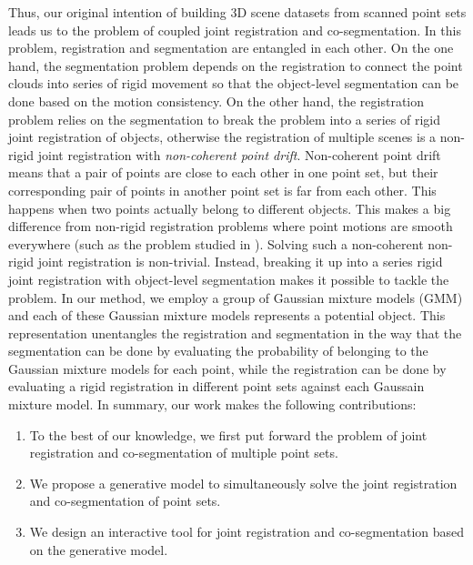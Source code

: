 Thus, our original intention of building 3D scene datasets from scanned point sets leads us to the problem of coupled joint registration and co-segmentation.
In this problem, registration and segmentation are entangled in each other. On the one hand, the segmentation problem depends on the registration to connect the point clouds into series of rigid movement so that the object-level segmentation can be done based on the motion consistency. 
On the other hand, the registration problem relies on the segmentation to break the problem into a series of rigid joint registration of objects, otherwise the registration of multiple scenes is a non-rigid joint registration with \emph{non-coherent point drift}.
%
Non-coherent point drift means that a pair of points are close to each other in one point set, but their corresponding pair of points in another point set is far from each other. 
This happens when two points actually belong to different objects.
%
This makes a big difference from non-rigid registration problems where point motions are smooth everywhere (such as the problem studied in \cite{CPD}).
%
Solving such a non-coherent non-rigid joint registration is non-trivial. Instead, breaking it up into a series rigid joint registration with object-level segmentation makes it possible to tackle the problem. 
%
In our method, we employ a group of Gaussian mixture models (GMM) and each of these Gaussian mixture models represents a potential object. 
This representation unentangles the registration and segmentation in the way that the segmentation can be done by evaluating the probability of belonging to the Gaussian mixture models for each point, while the registration can be done by evaluating a rigid registration in different point sets against each Gaussain mixture model.
%
In summary, our work makes the following contributions: 
\begin{enumerate}
	\item To the best of our knowledge, we first put forward the problem of joint registration and co-segmentation of multiple point sets.
	
	\item We propose a generative model to simultaneously solve the joint registration and co-segmentation of point sets.
	
	\item We design an interactive tool for joint registration and co-segmentation based on the generative model. 
\end{enumerate}
